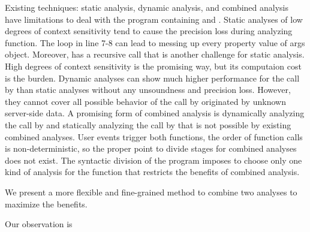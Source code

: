 Existing techniques: static analysis, dynamic analysis, and combined analysis
have limitations to deal with the program containing  and
.
Static analyses of low degrees of context sensitivity tend to cause the
precision loss during analyzing  function.
The loop in line 7-8 can lead to messing up every property value of args object.
Moreover,  has a recursive call that is another challenge
for static analysis.
High degrees of context sensitivity is the promising way, but its computaion
cost is the burden.
Dynamic analyses can show much higher performance for the  call
by  than static analyses without any unsoundness and
precision loss.
However, they cannot cover all possible behavior of the  call
by  originated by unknown server-side data.
A promising form of combined analysis is dynamically analyzing the call by 
and statically analyzing the call by  that is not possible by
existing combined analyses.
User events trigger both functions, the order of function calls is
non-deterministic, so the proper point to divide stages for combined analyses
does not exist.
The syntactic division of the program imposes to choose only one kind of analysis
for the  function that restricts the benefits of combined analysis.


We present a more flexible and fine-grained method to combine two analyses to
maximize the benefits.

Our observation is

